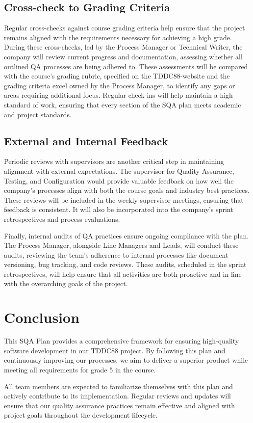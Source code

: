 \documentclass{article}
\begin{document}
\subsection{Cross-check to Grading Criteria}
Regular cross-checks against course grading criteria help ensure that the project remains aligned with the requirements necessary for achieving a high grade. During these cross-checks, led by the Process Manager or Technical Writer, the company will review current progress and documentation, assessing whether all outlined QA processes are being adhered to. These assessments will be compared with the course's grading rubric, specified on the TDDC88-website and the grading criteria excel owned by the Process Manager, to identify any gaps or areas requiring additional focus. Regular check-ins will help maintain a high standard of work, ensuring that every section of the SQA plan meets academic and project standards.

\subsection{External and Internal Feedback}
Periodic reviews with supervisors are another critical step in maintaining alignment with external expectations. The supervisor for Quality Assurance, Testing, and Configuration would provide valuable feedback on how well the company's processes align with both the course goals and industry best practices. These reviews will be included in the weekly supervisor meetings, ensuring that feedback is consistent. It will also be incorporated into the company’s sprint retrospectives and process evaluations.

Finally, internal audits of QA practices ensure ongoing compliance with the plan. The Process Manager, alongside Line Managers and Leads, will conduct these audits, reviewing the team's adherence to internal processes like document versioning, bug tracking, and code reviews. These audits, scheduled in the sprint retrospectives, will help ensure that all activities are both proactive and in line with the overarching goals of the project. 

\newpage
\section{Conclusion}
This SQA Plan provides a comprehensive framework for ensuring high-quality software development in our TDDC88 project. By following this plan and continuously improving our processes, we aim to deliver a superior product while meeting all requirements for grade 5 in the course.

All team members are expected to familiarize themselves with this plan and actively contribute to its implementation. Regular reviews and updates will ensure that our quality assurance practices remain effective and aligned with project goals throughout the development lifecycle.
\end{document}
